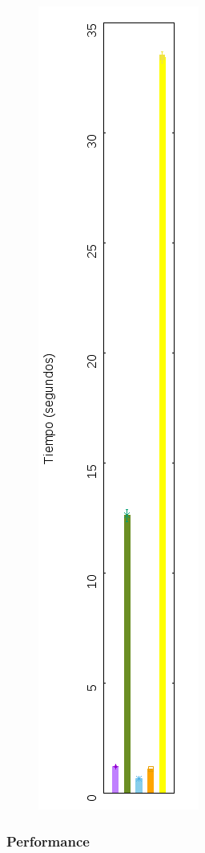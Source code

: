 \documentclass[10pt, a4paper]{article}
\begin{document}
\begin{figure}[H]
\centering
\includegraphics[scale=0.6,angle=-90]{../src/data/tm.png}
\end{figure}

\subsubsection{Performance}
\end{document}
